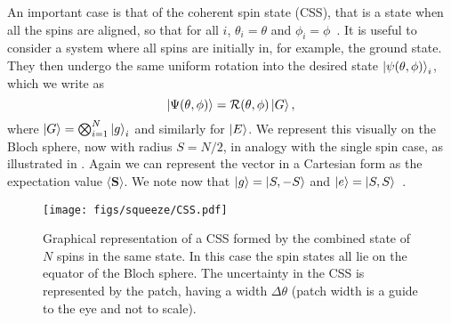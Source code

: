 An important case is that of the coherent spin state (CSS), that is a
state when all the spins are aligned, so that for all $i$, $\theta_i = \theta$
and $\phi_i = \phi$~\cite{MA201189, Gazeau2009}.
It is useful to consider a system where all spins are initially
in, for example, the ground state. They then undergo the same uniform rotation
into the desired state $\ket{\psi(\theta, \phi)}_i$, which we write as
%
\begin{equation}
  \ket{\Psi(\theta,\phi)} = \mathcal{R}(\theta, \phi)\ket{G},
\end{equation}
%
where $\ket{G} = \bigotimes_{i=1}^N\ket{g}_i$ and similarly for $\ket{E}$. We
represent this visually on the Bloch sphere, now with radius $S=N/2$, in
analogy with the single spin case, as illustrated in . Again
we can represent the vector in a Cartesian form as the expectation value
$\langle \mathbf{S} \rangle$. 
%
We note now that $\ket{g} = \ket{S,-S}$ and $\ket{e}=\ket{S,S}$~\cite{Binney}.

\begin{figure}[ht]
  \centering
    \texttt{[image: figs/squeeze/CSS.pdf]}
    \caption[Graphical representation of a coherent spin state]{
      Graphical representation of a CSS formed by the combined state of $N$
      spins in the same state. In this case the spin states all lie on the
      equator of the Bloch sphere. The uncertainty in the CSS is represented by
      the patch, having a width $\Delta\theta$ (patch width is a guide to the
      eye and not to scale).
  }
    \label{squeeze:fig:CSS}
\end{figure}


